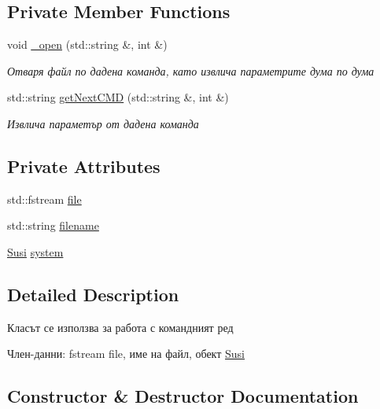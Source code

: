 \subsection*{Private Member Functions}
\begin{DoxyCompactItemize}
\item 
void \hyperlink{class_commands_a97f3494ce4d8e6a68ca2746b60decc37}{\+\_\+open} (std\+::string \&, int \&)
\begin{DoxyCompactList}\small\item\em Отваря файл по дадена команда, като извлича параметрите дума по дума \end{DoxyCompactList}\item 
std\+::string \hyperlink{class_commands_ad3d2136d6f9d46f62513fba7454b980f}{get\+Next\+C\+MD} (std\+::string \&, int \&)
\begin{DoxyCompactList}\small\item\em Извлича параметър от дадена команда \end{DoxyCompactList}\end{DoxyCompactItemize}
\subsection*{Private Attributes}
\begin{DoxyCompactItemize}
\item 
std\+::fstream \hyperlink{class_commands_a9e7fe16e45925df6eb4c5d3ebcdf27d5}{file}
\item 
std\+::string \hyperlink{class_commands_ae66931a1748a7543fa6089f16e815ad2}{filename}
\item 
\hyperlink{class_susi}{Susi} \hyperlink{class_commands_a70ae07baccbd18977008ae6f17c6c32c}{system}
\end{DoxyCompactItemize}


\subsection{Detailed Description}
Класът се използва за работа с командният ред 

Член-\/данни\+: fstream file, име на файл, обект \hyperlink{class_susi}{Susi} 

\subsection{Constructor \& Destructor Documentation}
\mbox{\label{class_commands_a5074950eaa028c7b44005a3c84870344}} 
